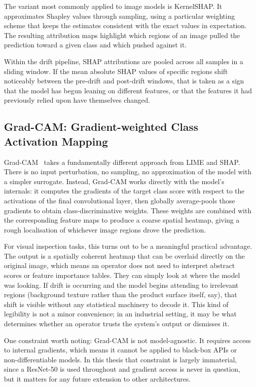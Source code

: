 The variant most commonly applied to image models is KernelSHAP. It approximates Shapley values through sampling, using a particular weighting scheme that keeps the estimates consistent with the exact values in expectation. The resulting attribution maps highlight which regions of an image pulled the prediction toward a given class and which pushed against it.

Within the drift pipeline, SHAP attributions are pooled across all samples in a sliding window. If the mean absolute SHAP values of specific regions shift noticeably between the pre-drift and post-drift windows, that is taken as a sign that the model has begun leaning on different features, or that the features it had previously relied upon have themselves changed.

\subsection{Grad-CAM: Gradient-weighted Class Activation Mapping}

Grad-CAM~\autocite{Selvaraju2017} takes a fundamentally different approach from LIME and SHAP. There is no input perturbation, no sampling, no approximation of the model with a simpler surrogate. Instead, Grad-CAM works directly with the model's internals: it computes the gradients of the target class score with respect to the activations of the final convolutional layer, then globally average-pools those gradients to obtain class-discriminative weights. These weights are combined with the corresponding feature maps to produce a coarse spatial heatmap, giving a rough localisation of whichever image regions drove the prediction.

For visual inspection tasks, this turns out to be a meaningful practical advantage. The output is a spatially coherent heatmap that can be overlaid directly on the original image, which means an operator does not need to interpret abstract scores or feature importance tables. They can simply look at where the model was looking. If drift is occurring and the model begins attending to irrelevant regions (background texture rather than the product surface itself, say), that shift is visible without any statistical machinery to decode it. This kind of legibility is not a minor convenience; in an industrial setting, it may be what determines whether an operator trusts the system's output or dismisses it.

One constraint worth noting: Grad-CAM is not model-agnostic. It requires access to internal gradients, which means it cannot be applied to black-box APIs or non-differentiable models. In this thesis that constraint is largely immaterial, since a ResNet-50 is used throughout and gradient access is never in question, but it matters for any future extension to other architectures.

